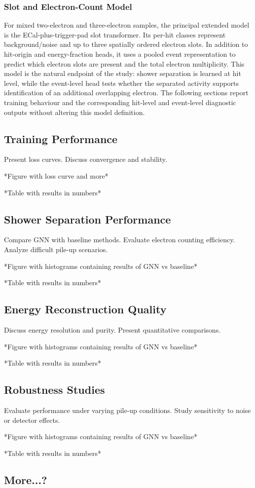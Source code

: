 \subsubsection{Slot and Electron-Count Model}

For mixed two-electron and three-electron samples, the principal extended
model is the ECal-plus-trigger-pad slot transformer. Its per-hit classes
represent background/noise and up to three spatially ordered electron slots.
In addition to hit-origin and energy-fraction heads, it uses a pooled event
representation to predict which electron slots are present and the total
electron multiplicity. This model is the natural endpoint of the study:
shower separation is learned at hit level, while the event-level head tests
whether the separated activity supports identification of an additional
overlapping electron. The following sections report training behaviour and
the corresponding hit-level and event-level diagnostic outputs without
altering this model definition.

\subsection{Training Performance}
Present loss curves.
Discuss convergence and stability.

*Figure with loss curve and more*

*Table with results in numbers*

\subsection{Shower Separation Performance}
Compare GNN with baseline methods.
Evaluate electron counting efficiency.
Analyze difficult pile-up scenarios.

*Figure with histograms containing results of GNN vs baseline*

*Table with results in numbers*

\subsection{Energy Reconstruction Quality}
Discuss energy resolution and purity.
Present quantitative comparisons.

*Figure with histograms containing results of GNN vs baseline*

*Table with results in numbers*

\subsection{Robustness Studies}
Evaluate performance under varying pile-up conditions.
Study sensitivity to noise or detector effects.

*Figure with histograms containing results of GNN vs baseline*

*Table with results in numbers*

\subsection{More...?}
